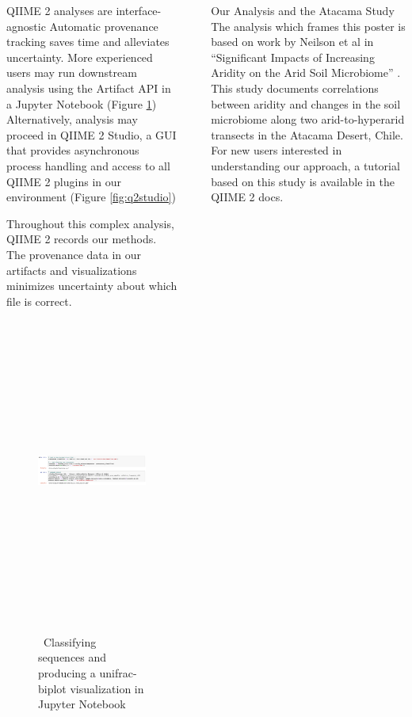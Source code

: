 \documentclass[final]{beamer}
\newlength{\sepwidth}
\newlength{\colwidth}
\newcommand{\separatorcolumn}{\begin{column}{\sepwidth}\end{column}}
\begin{document}
\begin{frame}[t]
\begin{columns}[t]
\begin{column}{\colwidth}
  \begin{block}{QIIME 2 analyses are interface-agnostic}
    Automatic provenance tracking saves time and alleviates uncertainty.
    More experienced users may run downstream analysis using the Artifact API in
    a Jupyter Notebook \cite{PER-GRA:2007} (Figure \ref{fig:taxabar})
    Alternatively, analysis may proceed in QIIME 2 Studio, a GUI
    that provides asynchronous process handling and access to all
    QIIME 2 plugins in our environment (Figure \ref{fig:q2studio})

    \begin{tcolorbox}
    [width=\textwidth, colframe=blue]
    {Throughout this complex analysis, QIIME 2 records our methods.
    The provenance data in our artifacts and visualizations minimizes
    uncertainty about which file is correct}.
    \end{tcolorbox}

    \begin{figure}[tph!]
      {\includegraphics[height=10cm]{assets/jupyter}}
      \caption{\, Classifying sequences and producing a unifrac-biplot visualization in Jupyter Notebook}
      \label{fig:taxabar}
    \end{figure}

  \end{block}

\end{column}

\separatorcolumn

\begin{column}{\colwidth}

  \begin{block}{Our Analysis and the Atacama Study}
    The analysis which frames this poster is based on work by Neilson et al in
    “Significant Impacts of Increasing Aridity on the Arid Soil Microbiome”
    \cite{Neilsone00195-16}. This study documents correlations between aridity
    and changes in the soil microbiome along two arid-to-hyperarid transects in
    the Atacama Desert, Chile. For new users interested in understanding
    our approach, a tutorial based on this study is available in the
    QIIME 2 docs.
  \end{block}


\end{column}
\end{columns}
\end{frame}
\end{document}
